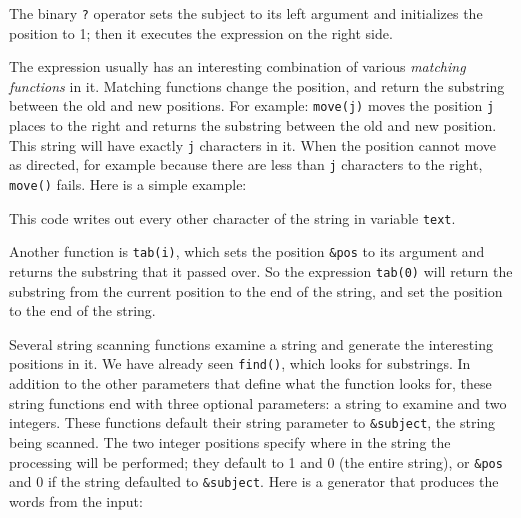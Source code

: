 
The binary \texttt{?} operator sets the subject to its left argument and
initializes the position to 1; then it executes the expression on the
right side.

The expression usually has an interesting combination of various
\textit{matching
functions} in it. Matching functions change the position, and return
the substring between the old and new positions. For example:
\texttt{move(j)} moves the position \texttt{j} places to the
right and returns the substring between the old and new position. This
string will have exactly \texttt{j} characters in it. When the position
cannot move as directed, for example because there are less than
\texttt{j} characters to the right, \texttt{move()}
fails. Here is a simple example:


This code writes out every other character of the string in variable
\texttt{text}.

Another function is \texttt{tab(i)}, which sets the
position \texttt{\&pos} to its argument and returns the substring that
it passed over. So the expression \texttt{tab(0)} will return the
substring from the current position to the end of the string, and set
the position to the end of the string.

Several string scanning functions examine a string and generate the interesting
positions in it. We have already seen \texttt{find()},
which looks for substrings. In addition to the other parameters that
define what the function looks for, these string functions end with
three optional parameters: a string to examine and two integers. These
functions default their string
parameter to \texttt{\&subject}, the string being scanned. The two
integer positions specify where in the string the processing will be
performed; they default to 1 and 0 (the entire string), or
\texttt{\&pos} and 0 if the string defaulted to \texttt{\&subject}.
Here is a generator that produces the words from the
input:


